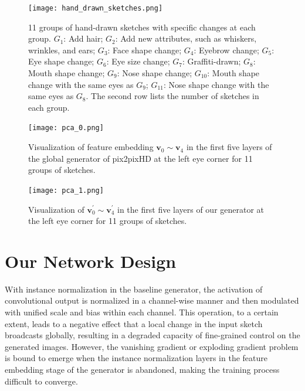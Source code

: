\begin{figure}[htbp]
	\centering
	\texttt{[image: hand\_drawn\_sketches.png]}
	\caption{11 groups of hand-drawn sketches with specific changes at each group. $G_1$: Add hair; $G_2$: Add new attributes, such as whiskers, wrinkles, and ears; $G_3$: Face shape change; $G_4$: Eyebrow change; $G_5$: Eye shape change; $G_6$: Eye size change; $G_7$: Graffiti-drawn; $G_8$: Mouth shape change; $G_9$: Nose shape change; $G_{10}$: Mouth shape change with the same eyes as $G_{9}$; $G_{11}$: Nose shape change with the same eyes as $G_{8}$. The second row lists the number of sketches in each group.
	}
	\label{fig:hand_drawn_contours}
\end{figure}


\begin{figure}[htb]
	\centering
	\texttt{[image: pca\_0.png]}
	\caption{Visualization of feature embedding $\boldsymbol{v}_0\sim\boldsymbol{v}_4$ in the first five layers of the global generator of pix2pixHD at the left eye corner for 11 groups of sketches.  }
	\label{fig:pca_0}
\end{figure}      

\begin{figure}[htb]
	\centering
	\texttt{[image: pca\_1.png]}
	\caption{Visualization of  $\boldsymbol{v}_0^{'}\sim\boldsymbol{v}_4^{'}$ in the first five layers of our generator at the left eye corner for 11 groups of sketches.}
	\label{fig:pca_1}
\end{figure}


\section{Our Network Design}\label{sec:network}
%
 
With instance normalization in the baseline generator, the activation of convolutional output is normalized in a channel-wise manner and then modulated with unified scale and bias within each channel. 
This operation, to a certain extent, leads to a negative effect that a local change in the input sketch broadcasts globally, resulting in a degraded capacity of fine-grained control on the generated images.
However, the vanishing gradient or exploding gradient problem is bound to emerge when the instance normalization layers in the feature embedding stage of the generator is abandoned, making the training process difficult to converge. 
 
